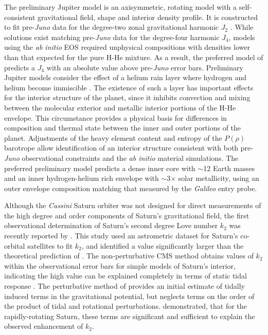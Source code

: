 The \citet{hubbard2016} preliminary Jupiter model is an axisymmetric, rotating model
with a self-consistent gravitational field, shape and interior density profile. It is
constructed to fit pre-\textit{Juno} data for the degree-two zonal gravitational
harmonic $J_2$ \citep{jacobson2003}. While solutions exist matching pre-\textit{Juno}
data for the degree-four harmonic $J_4$, models using the \textit{ab initio} EOS required unphysical
compositions with densities lower than that expected for the pure H-He mixture. As a result, the
preferred model of \citet{hubbard2016} predicts a $J_4$ with an absolute value above
pre-\textit{Juno} error bars. Preliminary Jupiter models consider the effect of a
helium rain layer where hydrogen and helium become immiscible \citep{stevenson1977a}.
The existence of such a layer has important effects for the interior structure of the
planet, since it inhibits convection and mixing between the molecular exterior and
metallic interior portions of the H-He envelope. This circumstance provides a
physical basis for differences in composition and thermal state between the inner and
outer portions of the planet.  Adjustments of the heavy element content and entropy
of the $P(\rho)$ barotrope allow identification of an interior structure consistent
with both pre-\textit{Juno} observational constraints and the \textit{ab initio}
material simulations. The preferred preliminary model predicts a dense inner core
with $\sim$12 Earth masses and an inner hydrogen-helium rich envelope with
$\sim$3$\times$ solar metallicity, using an outer envelope composition matching that
measured by the \textit{Galileo} entry probe.

Although the \textit{Cassini} Saturn orbiter was not designed for direct measurements
of the high degree and order components of Saturn's gravitational field, the first observational
determination of Saturn's second degree Love number $k_2$ was recently reported by
\citet{lainey2016}. This study used an astrometric dataset for Saturn's co-orbital
satellites to fit $k_2$, and identified a value significantly larger than the
theoretical prediction of \citet{gavrilov1977}. The non-perturbative CMS method
obtains values of $k_2$ within the observational error bars for simple models of
Saturn's interior, indicating the high value can be explained completely in terms of
static tidal response \citep{wahl2016}. The perturbative method of
\citet{gavrilov1977} provides an initial estimate of tidally induced terms in the
gravitational potential, but neglects terms on the order of the product of tidal
and rotational perturbations. \citet{wahl2016} demonstrated, that for the
rapidly-rotating Saturn, these terms are significant and sufficient to explain the
observed enhancement of $k_2$.

